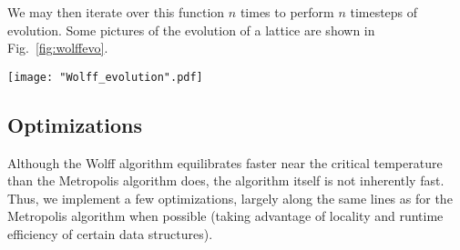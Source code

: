 \documentclass[twocolumn,aps,prl]{revtex4-1} %
\begin{document}
We may then iterate over this function $n$ times to perform $n$ timesteps of evolution. Some pictures of the evolution of a lattice are shown in Fig.~\ref{fig:wolffevo}.
\begin{figure*}
	\texttt{[image: "Wolff\_evolution".pdf]}
	\caption{\label{fig:wolffevo}The evolution of a $100 \times 100$ square lattice at $T = 2.4$ via the Wolff algorithm. The sequence is ordered from left to right, top to bottom. The two spin states $+1$ and $-1$ correspond to black and white, respectively. We have initialized the system in the $T = 0$ state, and plotted the system after 0, 1, 5, 10, 20, 50, 100, 500, and 1000 Monte Carlo steps. The lattice equilibrates much faster through the Wolff algorithm than through the Metropolis algorithm.}
\end{figure*}

\subsection{Optimizations}
Although the Wolff algorithm equilibrates faster near the critical temperature than the Metropolis algorithm does, the algorithm itself is not inherently fast. Thus, we implement a few optimizations, largely along the same lines as for the Metropolis algorithm when possible (taking advantage of locality and runtime efficiency of certain data structures).
\end{document}
